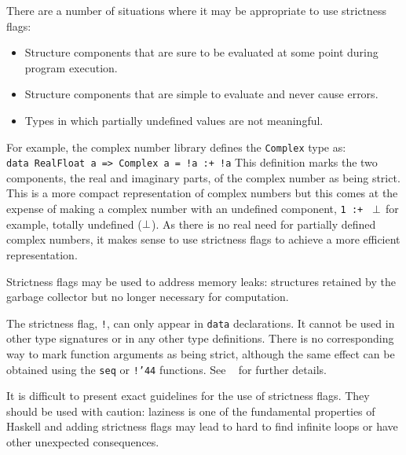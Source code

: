 There are a number of situations where it may be appropriate to use
strictness flags:
\begin{itemize}
\item Structure components that are sure to be evaluated at some
point during program execution.  
\item Structure components that are simple to evaluate and never
cause errors. 
\item Types in which partially undefined values are not meaningful.
\end{itemize}
For example, the complex number library defines the \mbox{\tt Complex} type as:
\bprog
\mbox{\tt data\ RealFloat\ a\ =>\ Complex\ a\ =\ !a\ :+\ !a}
\eprog
{} This definition
marks the two components, the real and imaginary parts, of the complex
number as being strict.  This is a more compact representation of
complex numbers but this comes at the expense of making a complex
number with an undefined component, \mbox{\tt 1\ :+\ } \mbox{$\it \bot$}  for example,
totally undefined (\mbox{$\it \bot$}).  As there is no real need for partially 
defined complex numbers, it makes sense to use strictness flags to
achieve a more efficient representation.

Strictness flags may be used to address memory leaks: structures
retained by the garbage collector but no longer necessary for computation.

The strictness flag, \mbox{\tt !}, can only appear in \mbox{\tt data} declarations.
It cannot be used in other type
signatures or in any other type definitions.  There is no
corresponding way to mark function arguments as being strict, although
the same effect can be obtained using the \mbox{\tt seq} or \mbox{\tt !{\char'44}} functions.  See
~ for further details. 

It is difficult to present exact guidelines for the use of strictness
flags.  They should be used with caution: laziness is one of the
fundamental properties of Haskell and adding strictness flags may lead
to hard to find infinite loops or have other unexpected consequences.




